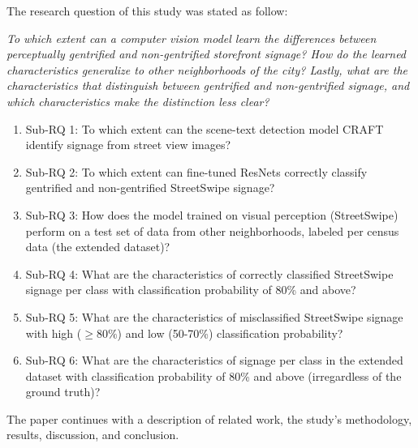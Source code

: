The research question of this study was stated as follow: 

\noindent\textit{To which extent can a computer vision model learn the differences between perceptually gentrified and non-gentrified storefront signage? How do the learned characteristics generalize to other neighborhoods of the city? Lastly, what are the characteristics that distinguish between gentrified and non-gentrified signage, and which characteristics make the distinction less clear?}

\begin{enumerate}
    \item Sub-RQ 1: To which extent can the scene-text detection model CRAFT identify signage from street view images?
    \item Sub-RQ 2: To which extent can fine-tuned ResNets correctly classify gentrified and non-gentrified StreetSwipe signage?
    \item Sub-RQ 3: How does the model trained on visual perception (StreetSwipe) perform on a test set of data from other neighborhoods, labeled per census data (the extended dataset)?
    \item Sub-RQ 4: What are the characteristics of correctly classified StreetSwipe signage per class with classification probability of 80\% and above?
    \item Sub-RQ 5: What are the characteristics of misclassified StreetSwipe signage with high ($ \geq 80\% $) and low (50-70\%) classification probability?
    \item Sub-RQ 6: What are the characteristics of signage per class in the extended dataset with classification probability of 80\% and above (irregardless of the ground truth)?
\end{enumerate}

The paper continues with a description of related work, the study's methodology, results, discussion, and conclusion.